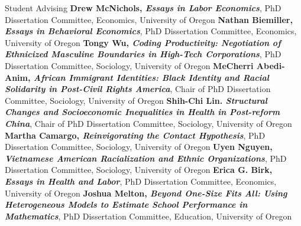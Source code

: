 \begin{rubric}{Student Advising}
\entry*[2019] \textbf{Drew McNichols, \emph{Essays in Labor Economics}}, PhD Dissertation Committee, Economics, University of Oregon  
\entry*[2019] \textbf{Nathan Biemiller, \emph{Essays in Behavioral Economics}}, PhD Dissertation Committee, Economics, University of Oregon  
\entry*[2018] \textbf{Tongy Wu, \emph{Coding Productivity: Negotiation of Ethnicized Masculine Boundaries in High-Tech Corporations}}, PhD Dissertation Committee, Sociology, University of Oregon  
\entry*[2017] \textbf{MeCherri Abedi-Anim, \emph{African Immigrant Identities: Black Identity and Racial Solidarity in Post-Civil Rights America}}, Chair of PhD Dissertation Committee, Sociology, University of Oregon  
\entry*[2017] \textbf{Shih-Chi Lin. \emph{Structural Changes and Socioeconomic Inequalities in Health in Post-reform China}}, Chair of PhD Dissertation Committee, Sociology, University of Oregon  
\entry*[2017] \textbf{Martha Camargo, \emph{Reinvigorating the Contact Hypothesis}}, PhD Dissertation Committee, Sociology, University of Oregon  
\entry*[2017] \textbf{Uyen Nguyen, \emph{Vietnamese American Racialization and Ethnic Organizations}}, PhD Dissertation Committee, Sociology, University of Oregon  
\entry*[2017] \textbf{Erica G. Birk, \emph{Essays in Health and Labor}}, PhD Dissertation Committee, Economics, University of Oregon  
\entry*[2016] \textbf{Joshua Melton, \emph{Beyond One-Size Fits All: Using Heterogeneous Models to Estimate School Performance in Mathematics}}, PhD Dissertation Committee, Education, University of Oregon  



\end{rubric}
